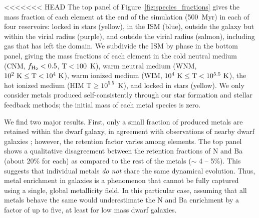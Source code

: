 \documentclass[twocolumn]{aastex61}
\begin{document}
<<<<<<< HEAD
The top panel of Figure~\ref{fig:species_fractions} gives the mass fraction of each element at the end of the simulation (500~Myr) in each of four reservoirs: locked in stars (yellow), in the ISM (blue), outside the galaxy but within the virial radius (purple), and outside the virial radius (salmon), including gas that has left the domain. We subdivide the ISM by phase in the bottom panel, giving the mass fractions of each element in the cold neutral medium (CNM, $f_{\rm H_2} < 0.5$,  T$< 100$~K), warm neutral medium (WNM, $10^2~\rm{K}\le \rm{T} < 10^4~\rm{K}$), warm ionized medium (WIM, $10^4~\rm{K}\le \rm{T} < 10^{5.5}~\rm{K}$), the hot ionized medium (HIM T$\ge 10^{5.5}$~K), and locked in stars (yellow). 
    We
only consider metals produced self-consistently through our star formation and stellar feedback methods; the initial mass of each metal species is zero.

We find two major results.
    First, 
only a small fraction of produced metals are retained within the dwarf galaxy, in agreement with observations of nearby dwarf galaxies \citep[see][]{Kirby2011-metals, McQuinn2015}; however, the retention factor varies 
    among elements. The top panel shows a qualitative disagreement between the retention fractions of N and Ba (about 20\% for each) as compared to the rest of the metals ($\sim$ 4 -- 5\%). This suggests that individual metals \textit{do not} share the same dynamical evolution. 
       Thus, 
metal enrichment in galaxies is a phenomenon that cannot be fully captured using a single, global metallicity field. In this particular case, assuming that all metals behave the same would underestimate the N and Ba enrichment by a factor of up to five, at least for low mass dwarf galaxies.
\end{document}
